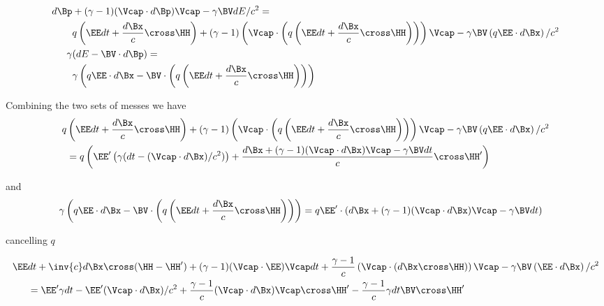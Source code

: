 \begin{equation}\label{eqn:lorentz_force_tx_2:60}
\begin{aligned}
d\Bp &+ (\gamma-1)(\Vcap \cdot d\Bp) \Vcap - \gamma \BV dE/c^2 = \\
&q \left( \EE dt + \frac{d\Bx}{c} \cross \HH \right) + (\gamma-1)\left(\Vcap \cdot \left(q \left( \EE dt + \frac{d\Bx}{c} \cross \HH \right)\right)\right) \Vcap - \gamma \BV \left( q \EE \cdot d\Bx \right)/c^2  \\
\gamma &( dE - \BV \cdot d\Bp ) = \\
&\gamma \left( q \EE \cdot d\Bx - \BV \cdot \left(q \left( \EE dt + \frac{d\Bx}{c} \cross \HH \right)\right) \right) 
\end{aligned}
\end{equation}

Combining the two sets of messes we have
\begin{equation}\label{eqn:lorentz_force_tx_2:80}
\begin{aligned}
q &\left( \EE dt + \frac{d\Bx}{c} \cross \HH \right) + (\gamma-1)\left(\Vcap \cdot \left(q \left( \EE dt + \frac{d\Bx}{c} \cross \HH \right)\right)\right) \Vcap - \gamma \BV \left( q \EE \cdot d\Bx \right)/c^2  \\
&=q \left( \EE' \left(\gamma ( dt - (\Vcap \cdot d\Bx )/c^2 )\right) + \frac{d\Bx + (\gamma-1)(\Vcap \cdot d\Bx) \Vcap - \gamma \BV dt}{c} \cross \HH' \right)  \\
\end{aligned}
\end{equation}

and
\begin{equation}\label{eqn:lorentz_force_tx_2:100}
\begin{aligned}
\gamma &\left( q \EE \cdot d\Bx - \BV \cdot \left(q \left( \EE dt + \frac{d\Bx}{c} \cross \HH \right)\right) \right) 
=
q \EE' \cdot \left(d\Bx + (\gamma-1)(\Vcap \cdot d\Bx) \Vcap - \gamma \BV dt\right)
\end{aligned}
\end{equation}

cancelling $q$

\begin{equation}\label{eqn:lorentz_force_tx_2:120}
\begin{aligned}
\EE &dt 
+ \inv{c} d\Bx \cross (\HH - \HH')
+ (\gamma-1)(\Vcap \cdot \EE) \Vcap dt 
+ \frac{\gamma-1}{c}\left(\Vcap \cdot \left( d\Bx \cross \HH \right)\right) \Vcap 
- \gamma \BV \left( \EE \cdot d\Bx \right)/c^2  \\
&=
\EE' \gamma dt 
-\EE' (\Vcap \cdot d\Bx )/c^2 
+ \frac{\gamma-1}{c} (\Vcap \cdot d\Bx) \Vcap \cross \HH' 
- \frac{\gamma-1}{c}\gamma dt \BV \cross \HH' 
\end{aligned}
\end{equation}

